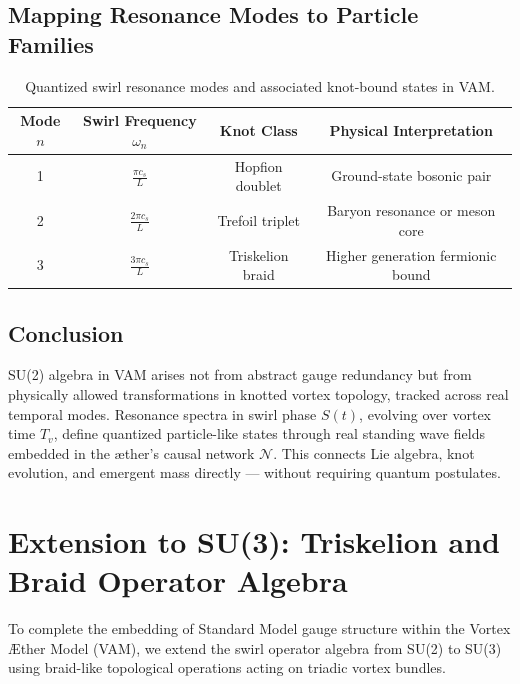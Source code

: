\documentclass[12pt]{article}
\begin{document}
\subsection*{Mapping Resonance Modes to Particle Families}

\begin{table}[H]
    \centering
    \footnotesize
    \renewcommand{\arraystretch}{1.4}
    \begin{tabular}{|c|c|c|c|}
        \hline
        \textbf{Mode} \( n \) & \textbf{Swirl Frequency} \( \omega_n \) & \textbf{Knot Class} & \textbf{Physical Interpretation} \\
        \hline
        1 & \( \frac{\pi c_s}{L} \) & Hopfion doublet & Ground-state bosonic pair \\
        2 & \( \frac{2\pi c_s}{L} \) & Trefoil triplet & Baryon resonance or meson core \\
        3 & \( \frac{3\pi c_s}{L} \) & Triskelion braid & Higher generation fermionic bound \\
        \hline
    \end{tabular}
    \caption{Quantized swirl resonance modes and associated knot-bound states in VAM.}
\end{table}

\subsection*{Conclusion}

SU(2) algebra in VAM arises not from abstract gauge redundancy but from physically allowed transformations in knotted vortex topology, tracked across real temporal modes. Resonance spectra in swirl phase \( S(t) \), evolving over vortex time \( T_v \), define quantized particle-like states through real standing wave fields embedded in the æther’s causal network \( \mathcal{N} \). This connects Lie algebra, knot evolution, and emergent mass directly — without requiring quantum postulates.

\section{Extension to SU(3): Triskelion and Braid Operator Algebra}

To complete the embedding of Standard Model gauge structure within the Vortex \AE{}ther Model (VAM), we extend the swirl operator algebra from SU(2) to SU(3) using braid-like topological operations acting on triadic vortex bundles.
\end{document}
